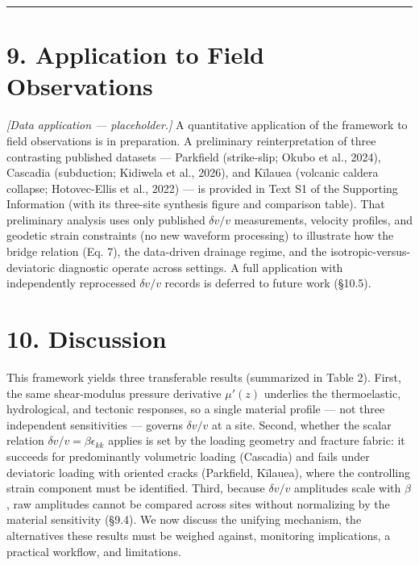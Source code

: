\documentclass[12pt]{article}
\begin{document}
\begin{center}\rule{0.5\linewidth}{0.5pt}\end{center}

\section{9. Application to Field
Observations}\label{application-to-field-observations}

\emph{{[}Data application --- placeholder.{]}} A quantitative
application of the framework to field observations is in preparation. A
preliminary reinterpretation of three contrasting published datasets ---
Parkfield (strike-slip; Okubo et al., 2024), Cascadia (subduction;
Kidiwela et al., 2026), and Kīlauea (volcanic caldera collapse;
Hotovec-Ellis et al., 2022) --- is provided in Text S1 of the Supporting
Information (with its three-site synthesis figure and comparison table).
That preliminary analysis uses only published \(\delta v/v\)
measurements, velocity profiles, and geodetic strain constraints (no new
waveform processing) to illustrate how the bridge relation (Eq. 7), the
data-driven drainage regime, and the isotropic-versus-deviatoric
diagnostic operate across settings. A full application with
independently reprocessed \(\delta v/v\) records is deferred to future
work (§10.5).

\section{10. Discussion}\label{discussion}

This framework yields three transferable results (summarized in Table
2). First, the same shear-modulus pressure derivative \(\mu'(z)\)
underlies the thermoelastic, hydrological, and tectonic responses, so a
single material profile --- not three independent sensitivities ---
governs \(\delta v/v\) at a site. Second, whether the scalar relation
\(\delta v/v = \beta\epsilon_{kk}\) applies is set by the loading
geometry and fracture fabric: it succeeds for predominantly volumetric
loading (Cascadia) and fails under deviatoric loading with oriented
cracks (Parkfield, Kīlauea), where the controlling strain component must
be identified. Third, because \(\delta v/v\) amplitudes scale with
\(\beta\), raw amplitudes cannot be compared across sites without
normalizing by the material sensitivity (§9.4). We now discuss the
unifying mechanism, the alternatives these results must be weighed
against, monitoring implications, a practical workflow, and limitations.
\end{document}

